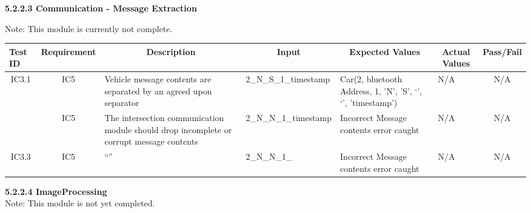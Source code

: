 \documentclass [10pt]{article}
\begin{document}
     \textbf{5.2.2.3 Communication - Message Extraction} 
     
     Note: This module is currently not complete.\\
     
 \begin{longtable}{ | p{ } | p{ } |  p{ } |  p{ } | p{ } | p{ } |  p{ } |}  \hline

    \rowcolor{subsectionC}\textbf{Test ID}
    & \multicolumn{1}{c|}{\textbf{Requirement} }
    &\multicolumn{1}{c|}{\textbf{Description} }
    & \multicolumn{1}{c|}{\textbf{Input} }
    & \multicolumn{1}{c|}{\textbf{Expected Values} }
    & \multicolumn{1}{c|}{\textbf{Actual Values} }
    & \multicolumn{1}{c|}{\textbf{Pass/Fail}} \\  \hline
    
       \multicolumn{1}{|c|}{IC3.1} 
    & \multicolumn{1}{c|}{IC5}
    &Vehicle message contents are separated by an agreed upon separator
    & 2\_N\_S\_1\_timestamp
    & Car(2, bluetooth Address, 1, 'N', 'S', `', `', 'timestamp') 
    &  N/A
    & \multicolumn{1}{c|}{N/A}\\\hline
    
    
    \rowcolor{tableCell}\multicolumn{1}{|c|}{IC3.2} 
    & \multicolumn{1}{c|}{IC5} 
    &The intersection communication module should drop incomplete or corrupt message contents
    & 2\_N\_N\_1\_timestamp
    & Incorrect Message contents error caught
    &  N/A
    & \multicolumn{1}{c|}{N/A}\\ \hline
    
    \multicolumn{1}{|c|}{IC3.3} 
    & \multicolumn{1}{c|}{IC5} 
    & ``''
    & 2\_N\_N\_1\_
    & Incorrect Message contents error caught
    &  N/A
    & \multicolumn{1}{c|}{N/A}\\ \hline
    
    \end{longtable}
    
    
    \textbf{5.2.2.4 ImageProcessing} \vspace{2mm}\\
    Note: This module is not yet completed. 
    
\end{document}
